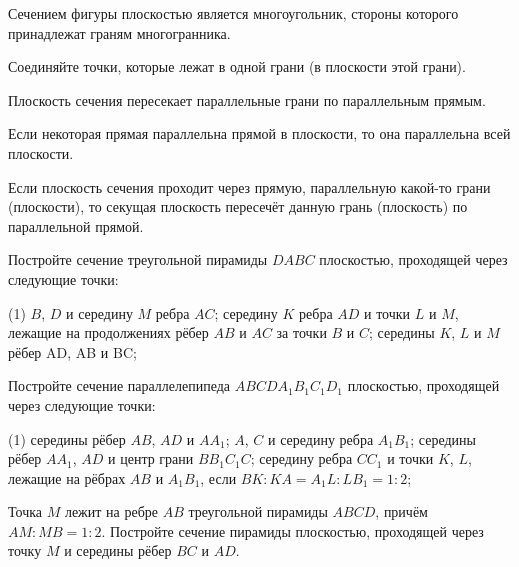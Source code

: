 \begin{class}[number=3]
	\begin{definit}
		Сечением фигуры плоскостью является многоугольник, стороны которого принадлежат граням многогранника.
	\end{definit}
	\begin{symrule}
		Соединяйте точки, которые лежат в одной грани (в плоскости этой грани).
	\end{symrule}
	\begin{symrule}
		Плоскость сечения пересекает параллельные грани по параллельным прямым.
	\end{symrule}
	\begin{definit}
		Если некоторая прямая параллельна прямой в плоскости, то она параллельна всей плоскости.
	\end{definit}
	\begin{symrule}
		Если плоскость сечения проходит через прямую,
		параллельную какой-то грани (плоскости), то секущая плоскость
		пересечёт данную грань (плоскость) по параллельной прямой.
	\end{symrule}
	\begin{listofex}
		\item Постройте сечение треугольной пирамиды \( DABC \) плоскостью,
		проходящей через следующие точки:
		\begin{tasks}(1)
			\task \( B \), \( D \) и середину \( M \) ребра \( AC \);
			\task середину \( K \) ребра \( AD \) и точки \( L \) и \( M \), лежащие на продолжениях
			рёбер \( AB \) и \( AC \) за точки \( B \) и \( C \);
			\task середины \( K \), \( L \) и \( M \) рёбер AD, AB и BC;
		\end{tasks}
		\item Постройте сечение параллелепипеда \( ABCDA_1B_1C_1D_1 \)
		плоскостью, проходящей через следующие точки:
		\begin{tasks}(1)
			\task середины рёбер \( AB \), \( AD \) и \( AA_1 \);
			\task \( A \), \( C \) и середину ребра \( A_1B_1 \);
			\task середины рёбер \( AA_1 \), \( AD \) и центр грани \( BB_1C_1C \);
			\task середину ребра \( CC_1 \) и точки \( K \), \( L \), лежащие на рёбрах \( AB \) и \( A_1B_1 \),
			если \( BK : KA= A_1L : LB_1=1 : 2 \);
		\end{tasks}
		\item Точка \(M\) лежит на ребре \(AB\) треугольной пирамиды \(ABCD\), причём \(AM : MB = 1:2\). Постройте сечение пирамиды плоскостью, проходящей через точку \(M\) и середины рёбер \(BC\) и \(AD\).

\end{listofex}
\end{class}
